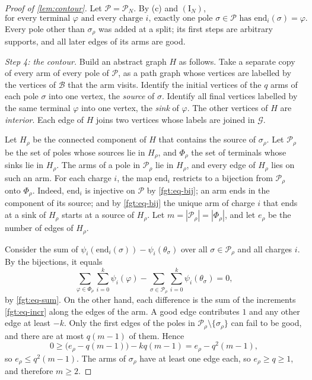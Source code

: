 \begin{proof}[Proof of \cref{lem:contour}]
Let $\mathcal P=\mathcal P_N$. By (c) and $(\mathrm I_N)$,
\begin{equation}\label{fgt:eq-bij}
\text{for every terminal }\varphi\text{ and every charge }i,\ \text{exactly one pole }\sigma\in\mathcal P\text{ has }\mathrm{end}_i(\sigma)=\varphi.
\end{equation}
Every pole other than $\sigma_\rho$ was added at a split; its first steps are arbitrary supports, and all later edges of its arms are good.

\emph{Step 4: the contour.} Build an abstract graph $H$ as follows. Take a separate copy of every arm of every pole of $\mathcal P$, as a path graph whose vertices are labelled by the vertices of $\mathcal B$ that the arm visits. Identify the initial vertices of the $q$ arms of each pole $\sigma$ into one vertex, the \emph{source} of $\sigma$. Identify all final vertices labelled by the same terminal $\varphi$ into one vertex, the \emph{sink} of $\varphi$. The other vertices of $H$ are \emph{interior}. Each edge of $H$ joins two vertices whose labels are joined in $\mathcal G$.

Let $H_\rho$ be the connected component of $H$ that contains the source of $\sigma_\rho$. Let $\mathcal P_\rho$ be the set of poles whose sources lie in $H_\rho$, and $\Phi_\rho$ the set of terminals whose sinks lie in $H_\rho$. The arms of a pole in $\mathcal P_\rho$ lie in $H_\rho$, and every edge of $H_\rho$ lies on such an arm. For each charge $i$, the map $\mathrm{end}_i$ restricts to a bijection from $\mathcal P_\rho$ onto $\Phi_\rho$. Indeed, $\mathrm{end}_i$ is injective on $\mathcal P$ by \eqref{fgt:eq-bij}; an arm ends in the component of its source; and by \eqref{fgt:eq-bij} the unique arm of charge $i$ that ends at a sink of $H_\rho$ starts at a source of $H_\rho$. Let $m=|\mathcal P_\rho|=|\Phi_\rho|$, and let $e_\rho$ be the number of edges of $H_\rho$.

Consider the sum of $\psi_i(\mathrm{end}_i(\sigma))-\psi_i(\theta_\sigma)$ over all $\sigma\in\mathcal P_\rho$ and all charges $i$. By the bijections, it equals
\[
\sum_{\varphi\in\Phi_\rho}\sum_{i=0}^k\psi_i(\varphi)-\sum_{\sigma\in\mathcal P_\rho}\sum_{i=0}^k\psi_i(\theta_\sigma)=0,
\]
by \eqref{fgt:eq-sum}. On the other hand, each difference is the sum of the increments \eqref{fgt:eq-incr} along the edges of the arm. A good edge contributes $1$ and any other edge at least $-k$. Only the first edges of the poles in $\mathcal P_\rho\setminus\{\sigma_\rho\}$ can fail to be good, and there are at most $q(m-1)$ of them. Hence
\[
0\ge\bigl(e_\rho-q(m-1)\bigr)-kq(m-1)=e_\rho-q^2(m-1),
\]
so $e_\rho\le q^2(m-1)$. The arms of $\sigma_\rho$ have at least one edge each, so $e_\rho\ge q\ge1$, and therefore $m\ge2$.


\end{proof}
